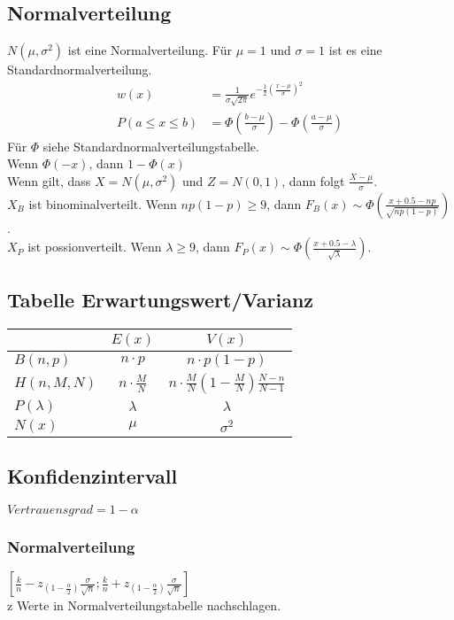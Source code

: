 \documentclass[a4paper, 10pt, landscape]{article}
\begin{document}
\begin{multicols}{5}
\begin{small}
	    	\subsection{Normalverteilung}
		    	$N(\mu, \sigma^2)$ ist eine Normalverteilung. Für $\mu = 1$ und $\sigma = 1$ ist es eine Standardnormalverteilung.
		    	\begin{align*}
		    		w(x) &= \frac{1}{\sigma \sqrt{2 \pi}} e^{-\frac{1}{2}(\frac{x-\mu}{\sigma})^2}\\
		    		P(a\le x\le b)&= \Phi(\frac{b-\mu}{\sigma})-\Phi(\frac{a-\mu}{\sigma})
		    	\end{align*}
		    	Für $\Phi$ siehe Standardnormalverteilungstabelle.\\
		    	Wenn $\Phi(-x)$, dann $1-\Phi(x)$\\
	    	
		    	Wenn gilt, dass $X = N(\mu, \sigma^2)$ und $Z = N(0,1)$, dann folgt $\frac{X - \mu}{\sigma}$. \\
		    	$X_B$ ist binominalverteilt. Wenn $np(1-p)\ge9$, dann $F_B(x) \sim \Phi\left(\frac{x + 0.5 - np}{\sqrt{np(1-p)}}\right)$. \\
		    	$X_P$ ist possionverteilt. Wenn $\lambda \ge 9$, dann $F_P(x) \sim \Phi\left(\frac{x + 0.5 - \lambda}{\sqrt{\lambda}}\right)$.
	    	
	    	\subsection{Tabelle Erwartungswert/Varianz}
		    	\begin{tabular}{l|c|c}
		    		&  $E(x)$ & $V(x)$\\ \hline
		    		$B(n,p)$ & $n\cdot p$ & $n\cdot p(1-p)$\\\hline
		    		$H(n,M,N)$ & $n\cdot\frac{M}{N}$ & $n\cdot\frac{M}{N}(1-\frac{M}{N})\frac{N-n}{N-1}$\\\hline
		    		$P(\lambda)$ & $\lambda$ & $\lambda$\\\hline
		    		$N(x)$ & $\mu$ & $\sigma^2$
		    	\end{tabular}
	    	\subsection{Konfidenzintervall}
		    	$Vertrauensgrad=1-\alpha$
		    	\subsubsection{Normalverteilung}
				    $[\frac{k}{n}-z_{(1-\frac{\alpha}{2})}\frac{\sigma}{\sqrt{n}};\frac{k}{n}+z_{(1-\frac{\alpha}{2})}\frac{\sigma}{\sqrt{n}}]$\\
				    z Werte in Normalverteilungstabelle nachschlagen. 

\end{small}
\end{multicols}
\end{document}
